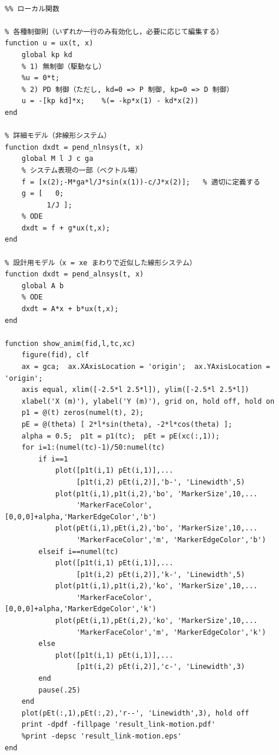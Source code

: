 \documentclass[a4j]{jarticle}
\begin{document}
\begin{lstlisting}[caption=matlab,label=matlab]
  
%% ローカル関数
  
% 各種制御則（いずれか一行のみ有効化し，必要に応じて編集する）
function u = ux(t, x)
    global kp kd
    % 1) 無制御（駆動なし）
    %u = 0*t;
    % 2) PD 制御（ただし, kd=0 => P 制御, kp=0 => D 制御）
    u = -[kp kd]*x;    %(= -kp*x(1) - kd*x(2))
end
  
% 詳細モデル（非線形システム）
function dxdt = pend_nlnsys(t, x)
    global M l J c ga
    % システム表現の一部（ベクトル場）
    f = [x(2);-M*ga*l/J*sin(x(1))-c/J*x(2)];   % 適切に定義する
    g = [   0;
          1/J ];
    % ODE
    dxdt = f + g*ux(t,x);
end
  
% 設計用モデル（x = xe まわりで近似した線形システム）
function dxdt = pend_alnsys(t, x)
    global A b
    % ODE
    dxdt = A*x + b*ux(t,x);
end
  
function show_anim(fid,l,tc,xc)
    figure(fid), clf
    ax = gca;  ax.XAxisLocation = 'origin';  ax.YAxisLocation = 'origin';
    axis equal, xlim([-2.5*l 2.5*l]), ylim([-2.5*l 2.5*l])
    xlabel('X (m)'), ylabel('Y (m)'), grid on, hold off, hold on
    p1 = @(t) zeros(numel(t), 2);
    pE = @(theta) [ 2*l*sin(theta), -2*l*cos(theta) ];
    alpha = 0.5;  p1t = p1(tc);  pEt = pE(xc(:,1));
    for i=1:(numel(tc)-1)/50:numel(tc)
        if i==1
            plot([p1t(i,1) pEt(i,1)],...
                 [p1t(i,2) pEt(i,2)],'b-', 'Linewidth',5)
            plot(p1t(i,1),p1t(i,2),'bo', 'MarkerSize',10,...
                 'MarkerFaceColor',[0,0,0]+alpha,'MarkerEdgeColor','b')
            plot(pEt(i,1),pEt(i,2),'bo', 'MarkerSize',10,...
                 'MarkerFaceColor','m', 'MarkerEdgeColor','b')
        elseif i==numel(tc)
            plot([p1t(i,1) pEt(i,1)],...
                 [p1t(i,2) pEt(i,2)],'k-', 'Linewidth',5)
            plot(p1t(i,1),p1t(i,2),'ko', 'MarkerSize',10,...
                 'MarkerFaceColor',[0,0,0]+alpha,'MarkerEdgeColor','k')
            plot(pEt(i,1),pEt(i,2),'ko', 'MarkerSize',10,...
                 'MarkerFaceColor','m', 'MarkerEdgeColor','k')
        else
            plot([p1t(i,1) pEt(i,1)],...
                 [p1t(i,2) pEt(i,2)],'c-', 'Linewidth',3)
        end
        pause(.25)
    end
    plot(pEt(:,1),pEt(:,2),'r--', 'Linewidth',3), hold off
    print -dpdf -fillpage 'result_link-motion.pdf'
    %print -depsc 'result_link-motion.eps'
end
\end{lstlisting}
\end{document}
